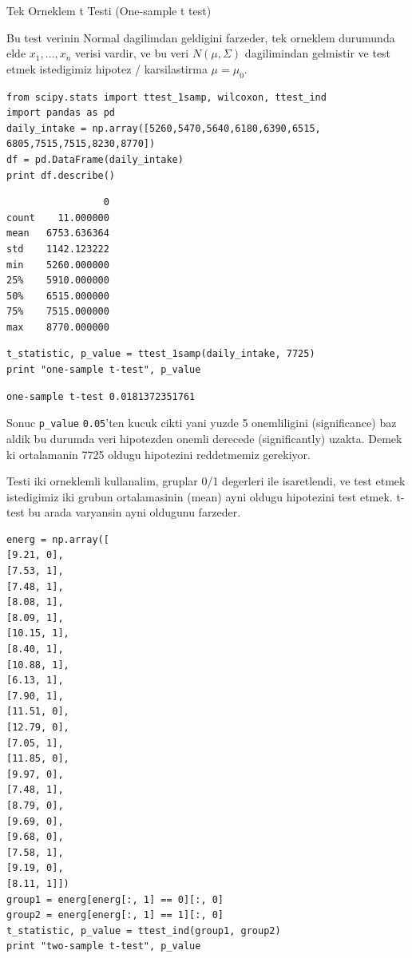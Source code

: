 \documentclass[12pt,fleqn]{article}\usepackage{../common}
\begin{document}
Tek Orneklem t Testi (One-sample t test)

Bu test verinin Normal dagilimdan geldigini farzeder, tek orneklem
durumunda elde $x_1,...,x_n$ verisi vardir, ve bu veri $N(\mu,\Sigma)$
dagilimindan gelmistir ve test etmek istedigimiz hipotez /
karsilastirma $\mu = \mu_0$. 

\begin{verbatim}
from scipy.stats import ttest_1samp, wilcoxon, ttest_ind
import pandas as pd
daily_intake = np.array([5260,5470,5640,6180,6390,6515, 6805,7515,7515,8230,8770])
df = pd.DataFrame(daily_intake)
print df.describe()
\end{verbatim}

\begin{verbatim}
                 0
count    11.000000
mean   6753.636364
std    1142.123222
min    5260.000000
25%    5910.000000
50%    6515.000000
75%    7515.000000
max    8770.000000
\end{verbatim}

\begin{verbatim}
t_statistic, p_value = ttest_1samp(daily_intake, 7725)
print "one-sample t-test", p_value
\end{verbatim}

\begin{verbatim}
one-sample t-test 0.0181372351761
\end{verbatim}

Sonuc \verb!p_value! \verb!0.05!'ten kucuk cikti yani
yuzde 5 onemliligini (significance) baz aldik bu durumda veri
hipotezden onemli derecede (significantly) uzakta. Demek ki
ortalamanin 7725 oldugu hipotezini reddetmemiz gerekiyor.

Testi iki orneklemli kullanalim, gruplar 0/1 degerleri ile
isaretlendi, ve test etmek istedigimiz iki grubun ortalamasinin (mean)
ayni oldugu hipotezini test etmek. t-test bu arada varyansin ayni
oldugunu farzeder.

\begin{verbatim}
energ = np.array([
[9.21, 0],
[7.53, 1],
[7.48, 1],
[8.08, 1],
[8.09, 1],
[10.15, 1],
[8.40, 1],
[10.88, 1],
[6.13, 1],
[7.90, 1],
[11.51, 0],
[12.79, 0],
[7.05, 1],
[11.85, 0],
[9.97, 0],
[7.48, 1],
[8.79, 0],
[9.69, 0],
[9.68, 0],
[7.58, 1],
[9.19, 0],
[8.11, 1]])
group1 = energ[energ[:, 1] == 0][:, 0]
group2 = energ[energ[:, 1] == 1][:, 0]
t_statistic, p_value = ttest_ind(group1, group2)
print "two-sample t-test", p_value
\end{verbatim}
\end{document}
